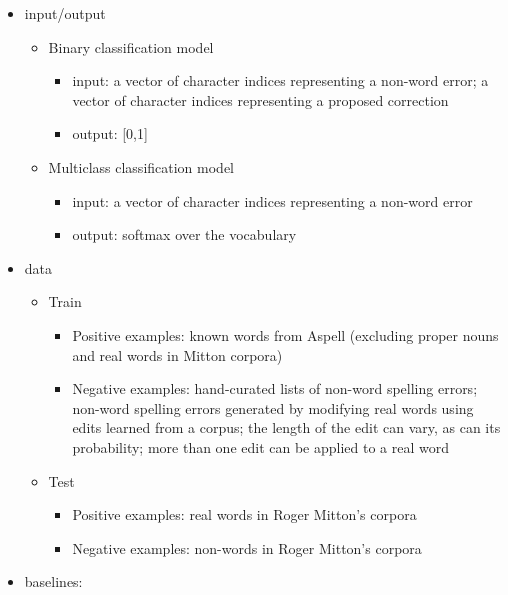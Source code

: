 \begin{itemize}
    \item input/output
        \begin{itemize}
            \item Binary classification model
                \begin{itemize}
                    \item input: a vector of character indices representing a non-word error; a vector of character indices representing a proposed correction
                    \item output: [0,1]
                \end{itemize}
            \item Multiclass classification model
                \begin{itemize}
                    \item input: a vector of character indices representing a non-word error
                    \item output: softmax over the vocabulary
                \end{itemize}
        \end{itemize}
    \item data
        \begin{itemize}
            \item Train
                \begin{itemize}
                    \item Positive examples: known words from Aspell (excluding proper nouns and real words in Mitton corpora) 
                    \item Negative examples: hand-curated lists of non-word spelling errors; non-word spelling errors generated by modifying real words using edits learned from a corpus; the length of the edit can vary, as can its probability; more than one edit can be applied to a real word 
                \end{itemize}
            \item Test
                \begin{itemize}
                    \item Positive examples: real words in Roger Mitton's corpora
                    \item Negative examples: non-words in Roger Mitton's corpora
                \end{itemize}
        \end{itemize}
    \item baselines:

\end{itemize}
